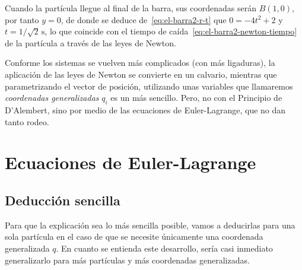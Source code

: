 \begin{itemize}
  Cuando la partícula llegue al final de la barra, sus coordenadas serán $B(1,0)$,
  por tanto $y = 0$, de donde se deduce de~\eqref{eq:el-barra2-r-t} que
  $0 = -4t^2 + 2$ y $t = 1/\sqrt{2}\,\si{\second}$, lo que coincide con el tiempo de
  caída~\eqref{eq:el-barra2-newton-tiempo} de la partícula a través de las leyes de Newton.
\end{itemize}

Conforme los sistemas se vuelven más complicados (con más ligaduras), la aplicación de las leyes de
Newton se convierte en un calvario, mientras que parametrizando el vector de posición, utilizando
unas variables que llamaremos \emph{coordenadas generalizadas} $q_i$ es un más sencillo.
Pero, no con el Principio de D'Alembert, sino por medio de las ecuaciones de Euler-Lagrange,
que no dan tanto rodeo.

\section{Ecuaciones de Euler-Lagrange}

\subsection{Deducción sencilla}
Para que la explicación sea lo más sencilla posible, vamos a deducirlas para una sola partícula en
el caso de que se necesite únicamente una coordenada generalizada $q$. En cuanto se entienda este
desarrollo, sería casi inmediato generalizarlo para más partículas y más coordenadas generalizadas.
